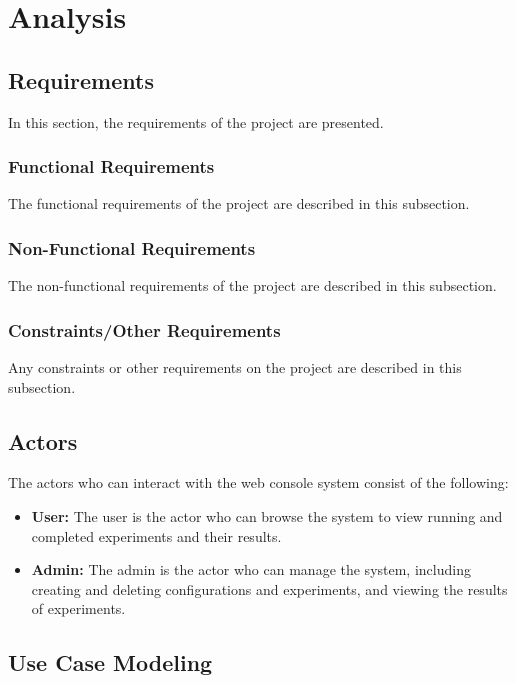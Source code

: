 \chapter{Analysis}

\section{Requirements}

In this section, the requirements of the project are presented.

\subsection{Functional Requirements}

The functional requirements of the project are described in this subsection.

\subsection{Non-Functional Requirements}

The non-functional requirements of the project are described in this subsection.

\subsection{Constraints/Other Requirements}

Any constraints or other requirements on the project are described in this subsection.

\section{Actors}

The actors who can interact with the web console system consist of the following:
\begin{itemize}
    \item \textbf{User:} The user is the actor who can browse the system to view running and completed experiments and their results.
    \item \textbf{Admin:} The admin is the actor who can manage the system, including creating and deleting configurations and experiments, and viewing the results of experiments.
\end{itemize}

\section{Use Case Modeling}

